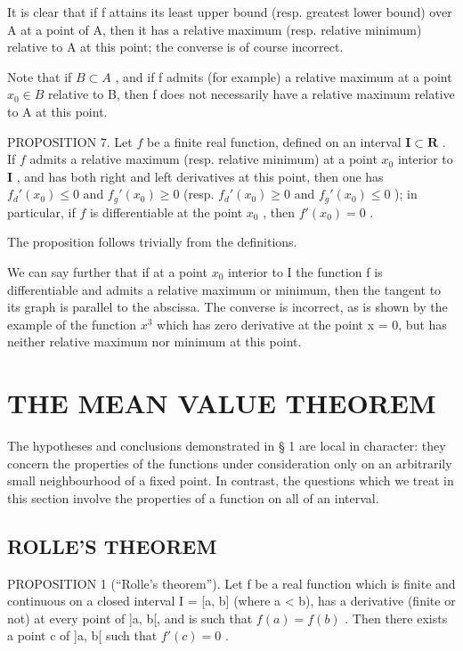 It is clear that if f attains its least upper bound (resp. greatest lower bound) over A at a point of A, then it has a relative maximum (resp. relative minimum) relative to A at this point; the converse is of course incorrect.

Note that if \(B \subset A\) , and if f admits (for example) a relative maximum at a point \(x_{0} \in B\) relative to B, then f does not necessarily have a relative maximum relative to A at this point.

PROPOSITION 7. Let \(f\) be a finite real function, defined on an interval \(\mathbf{I} \subset \mathbf{R}\) . If \(f\) admits a relative maximum (resp. relative minimum) at a point \(x_0\) interior to \(\mathbf{I}\) , and has both right and left derivatives at this point, then one has \(f_d'(x_0) \leqslant 0\) and \(f_g'(x_0) \geqslant 0\) (resp. \(f_d'(x_0) \geqslant 0\) and \(f_g'(x_0) \leqslant 0\) ); in particular, if \(f\) is differentiable at the point \(x_0\) , then \(f'(x_0) = 0\) .

The proposition follows trivially from the definitions.

We can say further that if at a point \(x_{0}\) interior to I the function f is differentiable and admits a relative maximum or minimum, then the tangent to its graph is parallel to the abscissa. The converse is incorrect, as is shown by the example of the function \(x^{3}\) which has zero derivative at the point x = 0, but has neither relative maximum nor minimum at this point.

\section{THE MEAN VALUE THEOREM}

The hypotheses and conclusions demonstrated in § 1 are local in character: they concern the properties of the functions under consideration only on an arbitrarily small neighbourhood of a fixed point. In contrast, the questions which we treat in this section involve the properties of a function on all of an interval.

\subsection{ROLLE'S THEOREM}

PROPOSITION 1 (``Rolle's theorem''). Let f be a real function which is finite and continuous on a closed interval I = {[}a, b{]} (where a \textless{} b), has a derivative (finite or not) at every point of {]}a, b{[}, and is such that \(f(a) = f(b)\) . Then there exists a point c of {]}a, b{[} such that \(f'(c) = 0\) .

